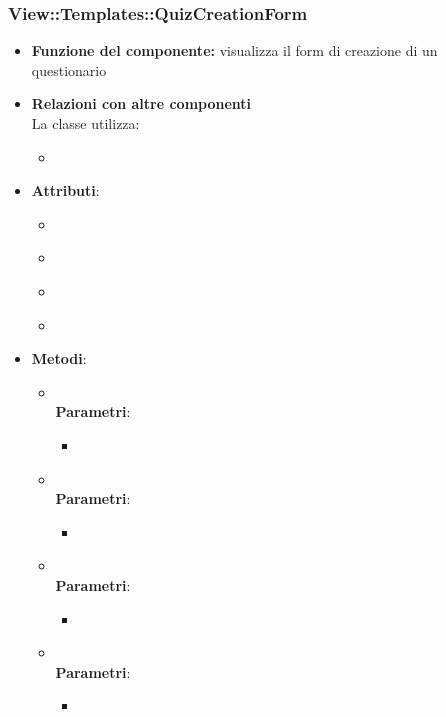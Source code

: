  \subsubsection{View::Templates::QuizCreationForm}
 \begin{itemize}
 \item\textbf{Funzione del componente:} visualizza il form di creazione di un questionario
 \item\textbf{Relazioni con altre componenti}\\
 La classe utilizza:
 	\begin{itemize}
 		\item
 	\end{itemize}
 \item\textbf{Attributi}:
 	\begin{itemize}
 		\item\code{}\\
 		\item\code{}\\
 		\item\code{}\\
 		\item\code{}\\
 	\end{itemize}
 \item\textbf{Metodi}:
 	\begin{itemize}
 		\item\code{}\\
 		\textbf{Parametri}:
 			\begin{itemize}
 				\item\code{}\\
 			\end{itemize}
 		\item\code{}\\
 		\textbf{Parametri}:
 			\begin{itemize}
 				\item\code{}\\
 			\end{itemize}
 		\item\code{}\\
 		\textbf{Parametri}:
 			\begin{itemize}
 				\item\code{}\\
 			\end{itemize}
 		\item\code{}\\
 		\textbf{Parametri}:
 			\begin{itemize}
 				\item\code{}\\
 			\end{itemize}
 	\end{itemize}
 \end{itemize}
 
